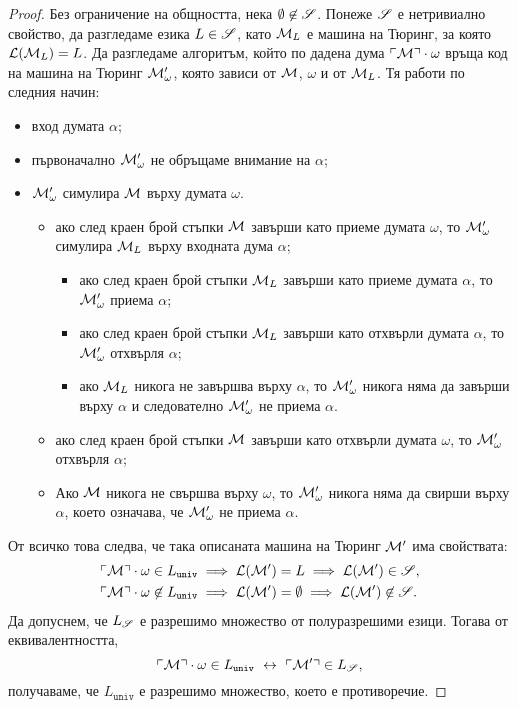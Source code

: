 \begin{proof}
  Без ограничение на общността, нека $\emptyset \not\in \mathscr{S}$.
  Понеже $\mathscr{S}$ е нетривиално свойство, да разгледаме езика $L \in \mathscr{S}$,
  като $\mathcal{M}_L$ е машина на Тюринг, за която $\mathcal{L}(\mathcal{M}_L) = L$.
  Да разгледаме алгоритъм, който по дадена дума $\ulcorner{\mathcal{M}}\urcorner\cdot\omega$
  връща код на машина на Тюринг $\mathcal{M}'_\omega$, която зависи от $\mathcal{M}$, $\omega$ и от $\mathcal{M}_L$.
  Тя работи по следния начин:
  \begin{itemize}
  \item
    вход думата $\alpha$;
  \item
    първоначално $\mathcal{M}'_\omega$ не обръщаме внимание на $\alpha$;
  \item
    $\mathcal{M}'_\omega$ симулира $\mathcal{M}$ върху думата $\omega$.
    \begin{itemize}
    \item
      ако след краен брой стъпки $\mathcal{M}$ завърши като приеме думата $\omega$, то 
      $\mathcal{M}'_\omega$ симулира $\mathcal{M}_L$ върху входната дума $\alpha$;
      \begin{itemize}
      \item
        ако след краен брой стъпки $\mathcal{M}_L$ завърши като приеме думата $\alpha$, то 
        $\mathcal{M}'_\omega$ приема $\alpha$;
      \item 
        ако след краен брой стъпки $\mathcal{M}_L$ завърши като отхвърли думата $\alpha$, то 
        $\mathcal{M}'_\omega$ отхвърля $\alpha$;
      \item
        ако $\mathcal{M}_L$ никога не завършва върху $\alpha$, то 
        $\mathcal{M}'_\omega$ никога няма да завърши върху $\alpha$ и следователно $\mathcal{M}'_\omega$
        не приема $\alpha$.
      \end{itemize}
    \item
      ако след краен брой стъпки $\mathcal{M}$ завърши като отхвърли думата $\omega$, то 
      $\mathcal{M}'_\omega$ отхвърля $\alpha$;
    \item
      Ако $\mathcal{M}$ никога не свършва върху $\omega$, то $\mathcal{M}'_\omega$ никога няма да свирши върху $\alpha$,
      което означава, че $\mathcal{M}'_\omega$ не приема $\alpha$.      
    \end{itemize}
  \end{itemize}
  От всичко това следва, че така описаната машина на Тюринг $\mathcal{M}'$ има свойствата:
  \begin{align*}
    & \ulcorner{\mathcal{M}}\urcorner\cdot\omega \in L_{\texttt{univ}} \implies \mathcal{L}(\mathcal{M}') = L \implies \mathcal{L}(\mathcal{M}') \in \mathscr{S},\\
    & \ulcorner{\mathcal{M}}\urcorner\cdot\omega \not\in L_{\texttt{univ}} \implies \mathcal{L}(\mathcal{M}') = \emptyset \implies \mathcal{L}(\mathcal{M}') \not\in \mathscr{S}.
  \end{align*}
  Да допуснем, че $L_{\mathscr{S}}$ е разрешимо множество от полуразрешими езици.
  Тогава от еквивалентността,
  \[\ulcorner{\mathcal{M}}\urcorner\cdot\omega \in L_{\texttt{univ}} \ \leftrightarrow\  \ulcorner{\mathcal{M}'}\urcorner \in L_{\mathscr{S}},\]
  получаваме, че $L_{\texttt{univ}}$ е разрешимо множество, което е противоречие.


\end{proof}
